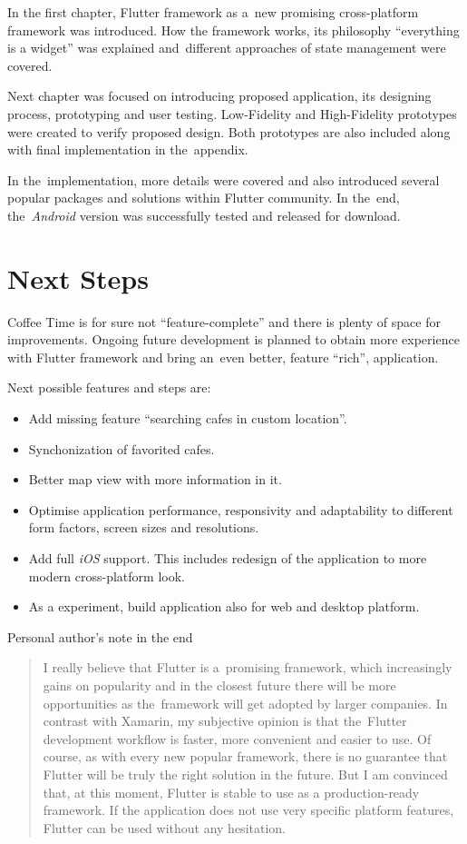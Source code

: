 \begin{conclusion}
In the first chapter, Flutter framework as a~new promising cross-platform framework was introduced. How the framework works, its philosophy ``everything is a widget'' was explained and~different approaches of state management were covered. 

Next chapter was focused on introducing proposed application, its designing process, prototyping and user testing. Low-Fidelity and High-Fidelity prototypes were created to verify proposed design. Both prototypes are also included along with final implementation in the~appendix. 

In the~implementation, more details were covered and also introduced several popular packages and solutions within Flutter community. In the~end, the~\textit{Android} version was successfully tested and released for download. 

\section{Next Steps}
Coffee Time is for sure not ``feature-complete'' and there is plenty of space for improvements. Ongoing future development is planned to obtain more experience with Flutter framework and bring an~even better, feature ``rich'', application. 

Next possible features and steps are:

\begin{itemize}
    \item Add missing feature ``searching cafes in custom location''.
    \item Synchonization of favorited cafes.
    \item Better map view with more information in it.
    \item Optimise application performance, responsivity and adaptability to different form factors, screen sizes and resolutions.
    \item Add full \textit{iOS} support. This includes redesign of the application to more modern cross-platform look. 
    \item As a experiment, build application also for web and desktop platform.
\end{itemize}

Personal author's note in the end

\begin{quote}
I really believe that Flutter is a~promising framework, which increasingly gains on popularity and in the closest future there will be more opportunities as the~framework will get adopted by larger companies. In contrast with Xamarin, my subjective opinion is that the~Flutter development workflow is faster, more convenient and easier to use. Of course, as with every new popular framework, there is no guarantee that Flutter will be truly the right solution in the future. But I am convinced that, at this moment, Flutter is stable to use as a  production-ready framework. If the application does not use very specific platform features, Flutter can be used without any hesitation.
\end{quote}
\end{conclusion}